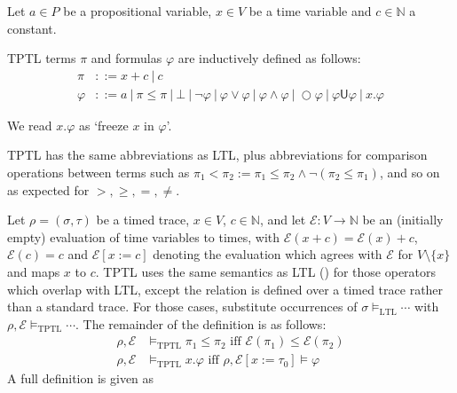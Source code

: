 \documentclass[a4paper]{article}
\newcommand{\U}{\mathsf{U}}
\newcommand{\tiff}{\text{ iff }}
\newcommand{\eval}{\mathcal{E}}
\begin{document}
\begin{defn}\label{tptlsyn}
  Let $a\in P$ be a propositional variable, $x\in V$ be a time variable and $c\in\mathbb{N}$ a constant.

  TPTL terms $\pi$ and formulas $\varphi$ are inductively defined as follows:
  \begin{align*}
    \pi &::= x + c ~|~ c\\
    \varphi &::= a ~|~ \pi \leq \pi ~|~ \bot ~|~ \neg \varphi ~|~\varphi \lor \varphi ~|~ \varphi \land \varphi ~|~ \bigcirc \varphi ~|~ \varphi \U \varphi ~|~ x. \varphi
  \end{align*}
\end{defn}

We read $x. \varphi$ as `freeze $x$ in $\varphi$'.

\begin{notn}[Abbreviations]\label{tptlabbrev}

  TPTL has the same abbreviations as LTL, plus abbreviations for comparison operations between terms such as $\pi_1 < \pi_2 := \pi_1 \leq \pi_2 \land \neg(\pi_2 \leq \pi_1)$, and so on as expected for $>,\geq,=,\neq$.
\end{notn}

\begin{defn}\label{tptlsem}

  Let $\rho = (\sigma,\tau)$ be a timed trace, $x\in V$, $c\in\mathbb{N}$, and let $\eval:V\to\mathbb{N}$ be an (initially empty) evaluation of time variables to times, with $\eval(x + c) = \eval(x) + c$, $\eval(c) = c$ and $\eval[x:=c]$ denoting the evaluation which agrees with $\eval$ for $V\setminus\{x\}$ and maps $x$ to $c$.
  TPTL uses the same semantics as LTL () for those operators which overlap with LTL, except the relation is defined over a timed trace rather than a standard trace. For those cases, substitute occurrences of $\sigma\vDash_{\text{LTL}}\cdots$ with $\rho,\eval\vDash_{\text{TPTL}}\cdots$. The remainder of the definition is as follows:
  \begin{align*}
    \rho,\eval &\vDash_{\text{TPTL}}\pi_1\leq\pi_2 \tiff \eval(\pi_1)\leq\eval(\pi_2)\\
    \rho,\eval &\vDash_{\text{TPTL}} x.\varphi \tiff \rho,\eval[x:=\tau_0]\vDash\varphi
  \end{align*}
  A full definition is given as 
\end{defn}
\end{document}
